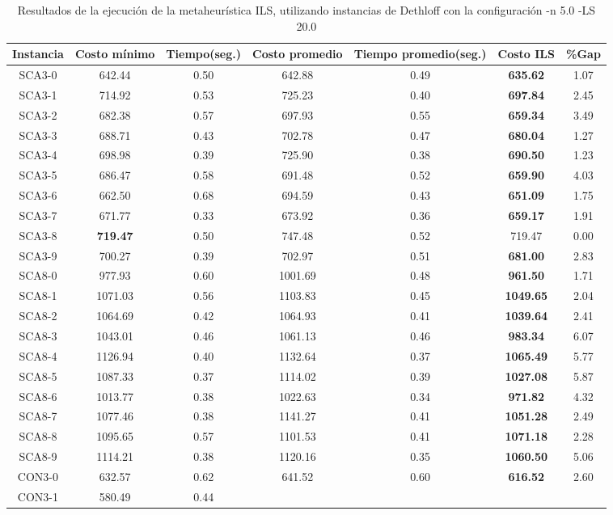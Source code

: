 \begin{table}[ht]
\caption{Resultados de la ejecución de la metaheurística ILS, utilizando instancias de Dethloff con la configuración -n 5.0 -LS 20.0}
\centering
\small
\begin{tabular}{c c c c c c c}
\hline\hline
Instancia & Costo mínimo & Tiempo(seg.) & Costo promedio & Tiempo promedio(seg.) & Costo ILS & \%Gap \\ [0.5ex]
\hline
SCA3-0 & 642.44 & 0.50 & 
642.88 & 0.49 & \bf{635.62} & 
1.07\\SCA3-1 & 714.92 & 0.53 & 
725.23 & 0.40 & \bf{697.84} & 
2.45\\SCA3-2 & 682.38 & 0.57 & 
697.93 & 0.55 & \bf{659.34} & 
3.49\\SCA3-3 & 688.71 & 0.43 & 
702.78 & 0.47 & \bf{680.04} & 
1.27\\SCA3-4 & 698.98 & 0.39 & 
725.90 & 0.38 & \bf{690.50} & 
1.23\\SCA3-5 & 686.47 & 0.58 & 
691.48 & 0.52 & \bf{659.90} & 
4.03\\SCA3-6 & 662.50 & 0.68 & 
694.59 & 0.43 & \bf{651.09} & 
1.75\\SCA3-7 & 671.77 & 0.33 & 
673.92 & 0.36 & \bf{659.17} & 
1.91\\SCA3-8 & \bf{719.47} & 0.50 & 
747.48 & 0.52 & 719.47 & 0.00\\
SCA3-9 & 700.27 & 0.39 & 
702.97 & 0.51 & \bf{681.00} & 
2.83\\SCA8-0 & 977.93 & 0.60 & 
1001.69 & 0.48 & \bf{961.50} & 
1.71\\SCA8-1 & 1071.03 & 0.56 & 
1103.83 & 0.45 & \bf{1049.65} & 
2.04\\SCA8-2 & 1064.69 & 0.42 & 
1064.93 & 0.41 & \bf{1039.64} & 
2.41\\SCA8-3 & 1043.01 & 0.46 & 
1061.13 & 0.46 & \bf{983.34} & 
6.07\\SCA8-4 & 1126.94 & 0.40 & 
1132.64 & 0.37 & \bf{1065.49} & 
5.77\\SCA8-5 & 1087.33 & 0.37 & 
1114.02 & 0.39 & \bf{1027.08} & 
5.87\\SCA8-6 & 1013.77 & 0.38 & 
1022.63 & 0.34 & \bf{971.82} & 
4.32\\SCA8-7 & 1077.46 & 0.38 & 
1141.27 & 0.41 & \bf{1051.28} & 
2.49\\SCA8-8 & 1095.65 & 0.57 & 
1101.53 & 0.41 & \bf{1071.18} & 
2.28\\SCA8-9 & 1114.21 & 0.38 & 
1120.16 & 0.35 & \bf{1060.50} & 
5.06\\CON3-0 & 632.57 & 0.62 & 
641.52 & 0.60 & \bf{616.52} & 
2.60\\CON3-1 & 580.49 & 0.44 & 

\end{tabular}
\end{table}

